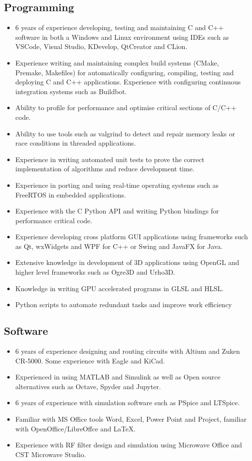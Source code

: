 \documentclass[]{friggeri-cv}
\begin{document}
\subsection{Programming}
\begin{itemize}
    \item 6 years of experience developing, testing and maintaining C and C++ software in both a Windows and Linux environment using IDEs such as VSCode, Visual Studio, KDevelop, QtCreator and CLion.
    \item Experience writing and maintaining complex build systems (CMake, Premake, Makefiles) for automatically configuring, compiling, testing and deploying C and C++ applications. Experience with configuring continuous integration systems such as Buildbot.
    \item Ability to profile for performance and optimise critical sections of C/C++ code.
    \item Ability to use tools such as valgrind to detect and repair memory leaks or race conditions in threaded applications.
    \item Experience in writing automated unit tests to prove the correct implementation of algorithms and reduce development time.
    \item Experience in porting and using real-time operating systems such as FreeRTOS in embedded applications.
    \item Experience with the C Python API and writing Python bindings for performance critical code.
    \item Experience developing cross platform GUI applications using frameworks such as Qt, wxWidgets and WPF for C++ or Swing and JavaFX for Java.
    \item Extensive knowledge in development of 3D applications using OpenGL and higher level frameworks such as Ogre3D and Urho3D.
    \item Knowledge in writing GPU accelerated programs in GLSL and HLSL.
    \item Python scripts to automate redundant tasks and improve work efficiency
\end{itemize}

\subsection{Software}
\begin{itemize}
    \item 6 years of experience designing and routing circuits with Altium and Zuken CR-5000. Some experience with Eagle and KiCad.
    \item Experienced in using MATLAB and Simulink as well as Open source alternatives such as Octave, Spyder and Jupyter.
    \item 6 years of experience with simulation software such as PSpice and LTSpice.
    \item Familiar with MS Office tools Word, Excel, Power Point and Project, familiar with OpenOffice/LibreOffce and LaTeX.
    \item Experience with RF filter design and simulation using Microwave Office and CST Microwave Studio.
\end{itemize}
\end{document}

